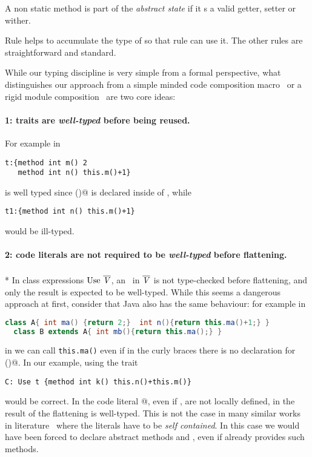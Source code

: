 \noindent A non static method is part of the \emph{abstract state} if 
it s a valid getter, setter or wither.


Rule  helps to accumulate the type of \Q@this@ so that rule 
can use it.
The other rules are straightforward and standard.


While our typing discipline is very simple from a formal perspective,  
what distinguishes our approach from a simple minded code composition macro~\cite{bawden1999quasiquotation}
or a rigid module composition~\cite{ancona2002calculus} are two core ideas:

\paragraph{1: traits are \emph{well-typed} before being reused.}
 For example in

\saveSpace\begin{lstlisting}
t:{method int m() 2 
   method int n() this.m()+1}
\end{lstlisting}\saveSpace

\noindent \Q@t@ is well typed since \Q@m()@ is declared inside of \Q@t@, while

\saveSpace\begin{lstlisting}
t1:{method int n() this.m()+1} 
\end{lstlisting}\saveSpace
\noindent would be ill-typed.

\paragraph{2: code literals are not required to be \emph{well-typed} before flattening.}${}_{}$\\*
In class expressions  $\use\ \overline\mV$,
an \mL\ in $\overline{\mathit{V}}$ is not type-checked before flattening, and only the result is expected to be well-typed.
While this seems a dangerous approach at first, consider that Java also has the same behaviour:
for example in
\saveSpace\begin{lstlisting}[language=Java]
  class A{ int ma() {return 2;}  int n(){return this.ma()+1;} }
  class B extends A{ int mb(){return this.ma();} }
\end{lstlisting}\saveSpace
\noindent in \Q@B@ we can call \lstinline{this.ma()} even if in the curly braces there is no declaration for \Q@ma()@.
In our example, using the trait \Q@t@

\saveSpace\begin{lstlisting}
C: Use t {method int k() this.n()+this.m()}
\end{lstlisting}\saveSpace
\noindent would be correct. In the code literal
@, 
 even if \Q@n@, \Q@m@ are not locally defined, in 
\name the result of the flattening is well-typed.
This is not the case in many similar works in literature~\cite{deep,Bettini2015282,Bergel2007} where the
literals have to be \emph{self contained}. In this case we would have been forced to
declare abstract methods \Q@n@ and \Q@m@, even if \Q@t@ already 
provides such methods.


